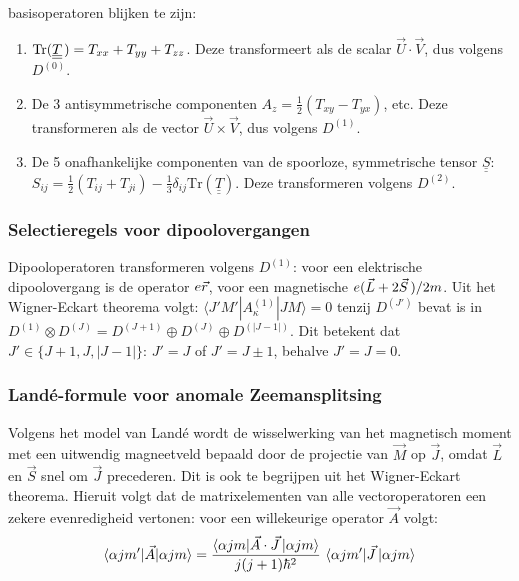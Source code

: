 \documentclass[twoside]{report}
\begin{document}
\begin{enumerate}
      basisoperatoren blijken te zijn:
      \begin{enumerate}
      \item $\mbox{Tr}(\underline{\underline{T}}\hspace*{0.5mm})=T_{xx}+T_{yy}+T_{zz}$. Deze transformeert
            als de scalar $\vec{U}\cdot\vec{V}$, dus volgens $D^{(0)}$.
      \item De 3 antisymmetrische componenten $A_z=\frac{1}{2}(T_{xy}-T_{yx})$, etc.
            Deze transformeren als de vector $\vec{U}\times\vec{V}$, dus
            volgens $D^{(1)}$.
      \item De 5 onafhankelijke componenten van de spoorloze, symmetrische tensor
            $\underline{\underline{S}}$:\\
            $S_{ij}=\frac{1}{2}(T_{ij}+T_{ji})-\frac{1}{3}\delta_{ij}\mbox{Tr}(\underline{\underline{T}})$.
            Deze transformeren volgens $D^{(2)}$.
      \end{enumerate}
\end{enumerate}

\subsubsection{Selectieregels voor dipoolovergangen}
Dipooloperatoren transformeren volgens $D^{(1)}$: voor een elektrische dipoolovergang
is de operator $e\vec{r}$, voor een magnetische $e(\vec{L}+2\vec{S}\,)/2m$.
\npar
Uit het Wigner-Eckart theorema volgt: $\langle J'M'|A^{(1)}_{\kappa}|JM\rangle=0$
tenzij $D^{(J')}$ bevat is in $D^{(1)}\otimes D^{(J)}=D^{(J+1)}\oplus D^{(J)}\oplus D^{(|J-1|)}$.
Dit betekent dat $J'\in\{ J+1,J,|J-1|\}$: $J'=J$ of $J'=J\pm1$, behalve $J'=J=0$.

\subsubsection{Land\'e-formule voor anomale Zeemansplitsing}
Volgens het model van Land\'e wordt de wisselwerking van het magnetisch moment
met een uitwendig magneetveld bepaald door de projectie van $\vec{M}$ op $\vec{J}$,
omdat $\vec{L}$ en $\vec{S}$ snel om $\vec{J}$ precederen. Dit is ook te
begrijpen uit het Wigner-Eckart theorema. Hieruit volgt dat de matrixelementen
van alle vectoroperatoren een zekere evenredigheid vertonen: voor een
willekeurige operator $\vec{A}$ volgt:
\[
\langle\alpha jm'|\vec{A}|\alpha jm\rangle=
\frac{\langle\alpha jm|\vec{A}\cdot\vec{J}\,|\alpha jm\rangle}{j(j+1)\hbar^2}~
\langle\alpha jm'|\vec{J}\,|\alpha jm\rangle
\]
\end{document}
